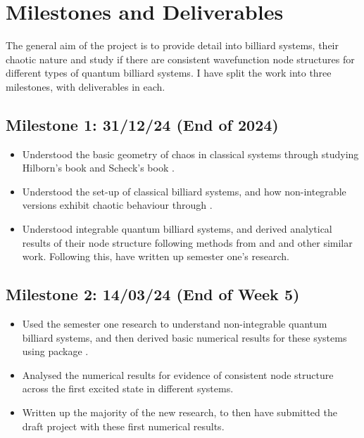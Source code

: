 \documentclass[12pt,a4paper]{amsart}
\begin{document}
\section{Milestones and Deliverables}

The general aim of the project is to provide detail into billiard systems, their chaotic nature and study if there are consistent wavefunction node structures for different types of quantum billiard systems. I have split the work into three milestones, with deliverables in each.

\subsection*{Milestone 1: 31/12/24 (End of 2024)}
\begin{itemize}
    \item Understood the basic geometry of chaos in classical systems through studying Hilborn's book \cite{HILBORN} and Scheck's book \cite{SCHECK}.
    \item Understood the set-up of classical billiard systems, and how non-integrable versions exhibit chaotic behaviour through \cite{KORSCH}.
    \item Understood integrable quantum billiard systems, and derived analytical results of their node structure following methods from \cite{ARND} and \cite{CASATI} and other similar work. Following this, have written up semester one's research.
\end{itemize}

\subsection*{Milestone 2: 14/03/24 (End of Week 5)}
\begin{itemize}
    \item Used the semester one research to understand non-integrable quantum billiard systems, and then derived basic numerical results for these systems using package \cite{CODE}.
    \item Analysed the numerical results for evidence of consistent node structure across the first excited state in different systems.
    \item Written up the majority of the new research, to then have submitted the draft project with these first numerical results.
\end{itemize}
\end{document}
